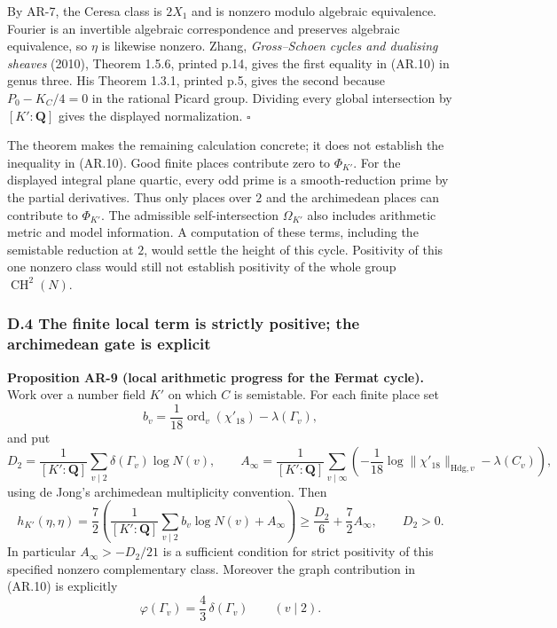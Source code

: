 \documentclass[11pt,a4paper]{article}
\begin{document}
By AR-7, the Ceresa class is \(2X_1\) and is nonzero modulo algebraic
equivalence. Fourier is an invertible algebraic correspondence and
preserves algebraic equivalence, so \(\eta\) is likewise nonzero. Zhang,
\emph{Gross--Schoen cycles and dualising sheaves} (2010), Theorem 1.5.6,
printed p.14, gives the first equality in (AR.10) in genus three. His
Theorem 1.3.1, printed p.5, gives the second because \(P_0-K_C/4=0\) in
the rational Picard group. Dividing every global intersection by
\([K':\mathbf Q]\) gives the displayed normalization. \(\square\)

The theorem makes the remaining calculation concrete; it does not
establish the inequality in (AR.10). Good finite places contribute zero
to \(\Phi_{K'}\). For the displayed integral plane quartic, every odd
prime is a smooth-reduction prime by the partial derivatives. Thus only
places over \(2\) and the archimedean places can contribute to
\(\Phi_{K'}\). The admissible self-intersection \(\Omega_{K'}\) also
includes arithmetic metric and model information. A computation of these
terms, including the semistable reduction at \(2\), would settle the
height of this cycle. Positivity of this one nonzero class would still
not establish positivity of the whole group \(\operatorname{CH}^2(N)\).

\subsubsection{D.4 The finite local term is strictly positive; the
archimedean gate is
explicit}\label{d.4-the-finite-local-term-is-strictly-positive-the-archimedean-gate-is-explicit}

\textbf{Proposition AR-9 (local arithmetic progress for the Fermat
cycle).} Work over a number field \(K'\) on which \(C\) is semistable.
For each finite place set \[
b_v=\frac1{18}\operatorname{ord}_v(\chi'_{18})-\lambda(\Gamma_v),
\] and put \[
D_2=\frac1{[K':\mathbf Q]}\sum_{v\mid2}\delta(\Gamma_v)\log N(v),\qquad
A_\infty=\frac1{[K':\mathbf Q]}\sum_{v\mid\infty}
\left(-\frac1{18}\log\|\chi'_{18}\|_{\mathrm{Hdg},v}-\lambda(C_v)\right),
\] using de Jong's archimedean multiplicity convention. Then \[
h_{K'}(\eta,\eta)
 =\frac72\left(
  \frac1{[K':\mathbf Q]}\sum_{v\mid2}b_v\log N(v)+A_\infty
 \right)
 \ge\frac{D_2}{6}+\frac72 A_\infty,\qquad D_2>0.
\tag{AR.12}
\] In particular \(A_\infty>-D_2/21\) is a sufficient condition for
strict positivity of this specified nonzero complementary class.
Moreover the graph contribution in (AR.10) is explicitly \[
\varphi(\Gamma_v)=\frac43\,\delta(\Gamma_v)\qquad(v\mid2).
\tag{AR.13}
\]
\end{document}
